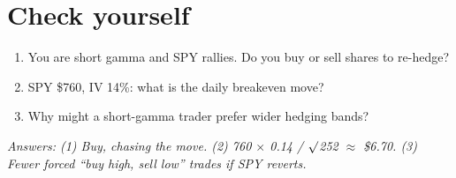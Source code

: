 \documentclass{article}
\begin{document}
\section{Check yourself}

\begin{enumerate}

\item You are short gamma and SPY rallies. Do you buy or sell shares to re-hedge?

\item SPY \$760, IV 14\%: what is the daily breakeven move?

\item Why might a short-gamma trader prefer wider hedging bands?

\end{enumerate}

\emph{Answers: (1) Buy, chasing the move. (2) 760 \ensuremath{\times} 0.14 /\allowbreak{} \ensuremath{\surd}252 \ensuremath{\approx} \$6.70. (3) Fewer forced ``buy high, sell low'' trades if SPY reverts.}
\end{document}
